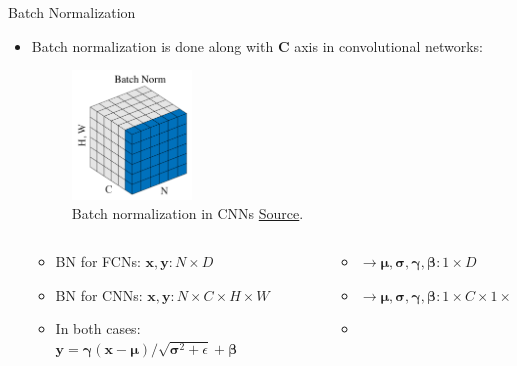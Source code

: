 \begin{frame}{Batch Normalization}
\begin{itemize}
\item Batch normalization is done along with \textbf{C} axis in convolutional networks:
\begin{figure}
	\centering
	\includegraphics[width=0.3\textwidth]{Images/batch normalization for cnn.png}
	\caption{Batch normalization in CNNs \href{https://arxiv.org/pdf/1803.08494.pdf}{Source}.}
	\label{fig:batch normalization for cnn}
\end{figure}

\vspace{-20pt}

\begin{columns}
\begin{column}{0.6 \textwidth}
\begin{itemize}
	\item BN for FCNs: $\pmb{x}, \pmb{y}: N\times D $
	\item BN for CNNs: $\pmb{x}, \pmb{y}: N\times C \times H \times W $
	\item In both cases: $\pmb{y} = \pmb{\gamma} (\pmb{x} - \pmb{\mu}) / \sqrt{\pmb{\sigma}^2 + \epsilon} + \pmb{\beta}$
\end{itemize}
\end{column}
\begin{column}{0.4 \textwidth}
\begin{itemize}
\item[] $\rightarrow \pmb{\mu}, \pmb{\sigma}, \pmb{\gamma}, \pmb{\beta}: 1\times D$
\item [] $\rightarrow \pmb{\mu}, \pmb{\sigma}, \pmb{\gamma}, \pmb{\beta}: 1\times C \times 1 \times 1$
\item []
\end{itemize}
\end{column}
\end{columns}
\end{itemize}

\end{frame}




